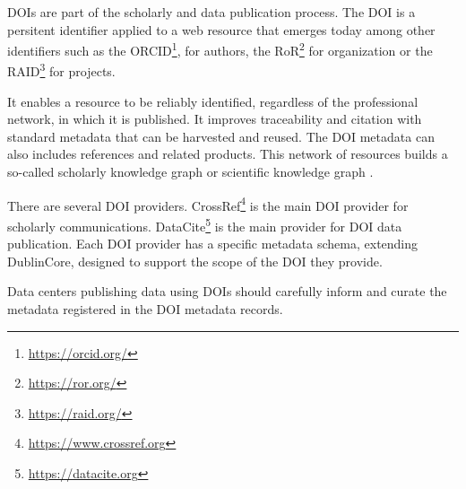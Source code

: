\documentclass[11pt,a4paper]{ivoa}
\begin{document}
DOIs are part of the scholarly and data publication process. The DOI 
is a persitent identifier applied to a web resource that emerges 
today among other identifiers such as the ORCID\footnote{\url{https://orcid.org/}}, 
for authors, the RoR\footnote{\url{https://ror.org/}} for organization 
or the RAID\footnote{\url{https://raid.org/}} for projects.

It enables a resource to be reliably identified, regardless of the 
professional network, in which it is published. It improves traceability 
and citation with standard metadata that can be harvested and reused. 
The DOI metadata can also includes references and related products.  
This network of resources builds a so-called scholarly knowledge graph
\citep{} or scientific knowledge graph \citep{}.

There are several DOI providers. CrossRef\footnote{\url{https://www.crossref.org}}
is the main DOI provider for scholarly communications. 
DataCite\footnote{\url{https://datacite.org}} is the main provider
for DOI data publication. Each DOI provider has a specific metadata
schema, extending DublinCore, designed to support the scope of the 
DOI they provide.


Data centers publishing data using DOIs should carefully inform and 
curate the metadata registered in the DOI metadata records.  
\end{document}
